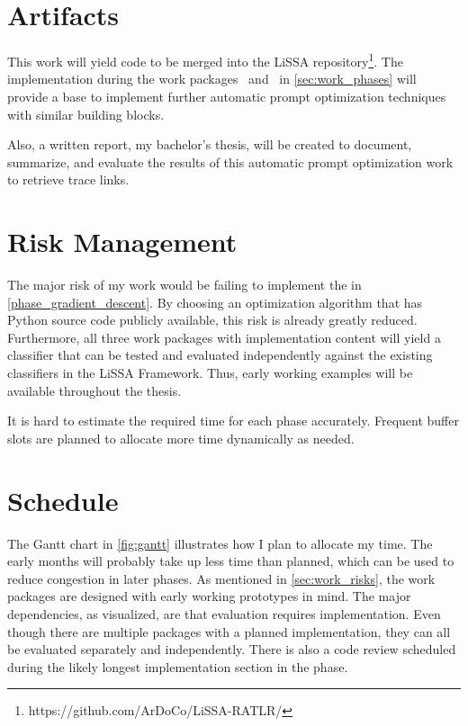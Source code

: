 \section{Artifacts}
\label{sec:work_artifacts}
This work will yield code to be merged into the LiSSA repository\footnote{https://github.com/ArDoCo/LiSSA-RATLR/}.
The implementation during the work packages~ and~ in \autoref{sec:work_phases} will provide a base to implement further automatic prompt optimization techniques with similar building blocks.

Also, a written report, my bachelor's thesis, will be created to document, summarize, and evaluate the results of this automatic prompt optimization work to retrieve trace links.


\section{Risk Management}
\label{sec:work_risks}
The major risk of my work would be failing to implement the  in \autoref{phase_gradient_descent}.
By choosing an optimization algorithm that has Python source code publicly available, this risk is already greatly reduced.
Furthermore, all three work packages with implementation content will yield a classifier that can be tested and evaluated independently against the existing classifiers in the LiSSA Framework.
Thus, early working examples will be available throughout the thesis.

It is hard to estimate the required time for each phase accurately.
Frequent buffer slots are planned to allocate more time dynamically as needed.




\section{Schedule}
\label{sec:work_gant}
The Gantt chart in \autoref{fig:gantt} illustrates how I plan to allocate my time.
The early months will probably take up less time than planned, which can be used to reduce congestion in later phases.
As mentioned in \autoref{sec:work_risks}, the work packages are designed with early working prototypes in mind.
The major dependencies, as visualized, are that evaluation requires implementation. 
Even though there are multiple packages with a planned implementation, they can all be evaluated separately and independently.
There is also a code review scheduled during the likely longest implementation section in the  phase.


